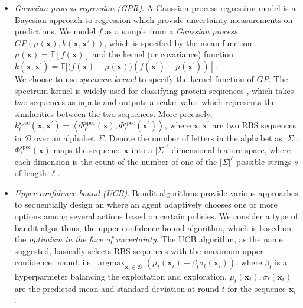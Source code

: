 \begin{itemize}
    \item \textit{Gaussian process regression (GPR)}.
    A Gaussian process regression model \cite{Rasmussen2004} is a Bayesian approach to regression which provide uncertainty measurements on predictions. 
    We model $f$ as a sample from a \textit{Gaussian process} $GP(\mu(\mathbf{x}), k(\mathbf{x}, \mathbf{x'}))$, which is specified by the mean function $\mu(\mathbf{x})=\mathbb{E}[f(\mathbf{x})]$ and the kernel (or covariance) function $k\left(\mathbf{x}, \mathbf{x}^{\prime}\right)=\mathbb{E}[(f(\mathbf{x})-\left.\mu(\mathbf{x}))\left(f\left(\mathbf{x}^{\prime}\right)-\mu\left(\mathbf{x}^{\prime}\right)\right)\right]$.\\
    We choose to use \textit{spectrum kernel} \cite{leslie2001spectrum} to specify the kernel function of $GP$.  
    The spectrum kernel is widely used for classifying protein sequences \cite{leslie2001spectrum, ben2008support}, which takes two sequences as inputs and outputs a scalar value which represents the similarities between the two sequences. More precisely, $k_\ell^{\text{spec}}(\textbf{x}, \textbf{x}^\prime) =\left\langle\Phi_{\ell}^{\mathrm{spec}}(\mathbf{x}), \Phi_{\ell}^{\mathrm{spec}}\left(\mathbf{x}^{\prime}\right)\right\rangle$, where $\mathbf{x}, \mathbf{x}^\prime$ are two RBS sequences in $\mathcal{D}$ over an alphabet $\Sigma$. Denote the number of letters in the alphabet as $|\Sigma|$. $\Phi_{\ell}^{\mathrm{spec}}(\mathbf{x})$ maps the sequence $\textbf{x}$ into a $|\Sigma|^\ell$ dimensional feature space, where each dimension is the count of the number of one of the $|\Sigma|^\ell$ possible strings $s$ of length $\ell$.
    
    
    \item \textit{Upper confidence bound (UCB)}. Bandit algorithms \cite{lattimore2018bandit} provide various approaches to sequentially design an where an agent adaptively chooses one or more options among several actions based on certain policies. We consider a type of bandit algorithms, the upper confidence bound algorithm, which is based on the \textit{optimism in the face of uncertainty}. The UCB algorithm, as the name suggested, basically selects RBS sequences with the maximum upper confidence bound, i.e. $\operatorname{argmax}_{\mathbf{x}_i \in \mathcal{D}} \left( \mu_t(\mathbf{x}_i) + \beta_t \sigma_t(\mathbf{x}_i)\right)$,
    where $\beta_t$ is a hyperparmeter balancing the exploitation and exploration, 
    $\mu_t(\mathbf{x}_i), \sigma_t(\mathbf{x}_i)$ are the predicted mean and standard deviation at round $t$ for the sequence $\mathbf{x}_i$. 
\end{itemize}

